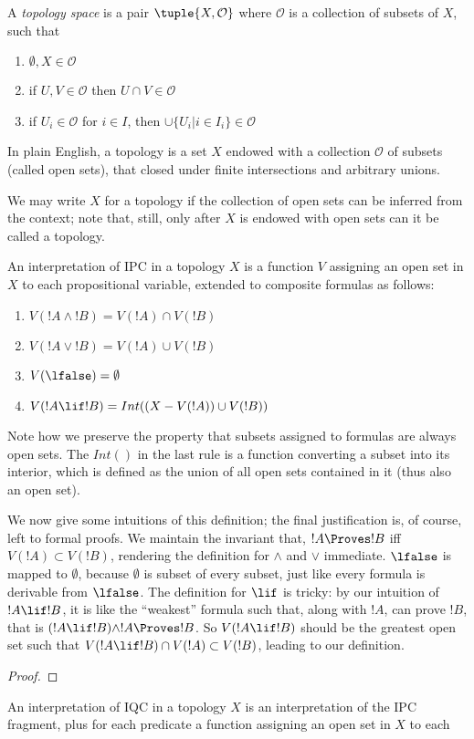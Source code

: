 
\begin{defn}[Topology]
  A \emph{topology space} is a pair $\tuple{X, \mathcal{O}}$ where
  $\mathcal{O}$ is a collection of subsets of $X$, such that
  \begin{enumerate}
  \item $\emptyset, X \in \mathcal{O}$
  \item if $U,V \in \mathcal{O}$ then $U \cap V \in \mathcal{O}$
  \item if $U_i \in \mathcal{O}$ for $i \in I$, then $\cup\{U_i | i \in 
    I_i\} \in \mathcal{O}$
  \end{enumerate}
\end{defn}

In plain English, a topology is a set $X$ endowed with a collection
$\mathcal{O}$ of subsets (called open sets), that closed under finite
intersections and arbitrary unions.

We may write $X$ for a topology if the collection of open sets can be
inferred from the context; note that, still, only after $X$ is endowed
with open sets can it be called a topology.

\begin{defn}
  An interpretation of IPC in a topology $X$ is a function $V$ assigning
  an open set in $X$ to each propositional variable, extended to composite
  formulas as follows:
  \begin{enumerate}
  \item $V(!A \land !B) = V(!A) \cap V(!B)$
  \item $V(!A \lor !B) = V(!A) \cup V(!B)$
  \item $V(\lfalse) = \emptyset$
  \item $V(!A \lif !B) = Int((X - V(!A)) \cup V(!B))$
  \end{enumerate}
\end{defn}

Note how we preserve the property that subsets assigned to formulas are
always open sets. The $Int()$ in the last rule is a function converting a
subset into its interior, which is defined as the union of all open
sets contained in it (thus also an open set).

We now give some intuitions of this definition; the final
justification is, of course, left to formal proofs. We maintain the
invariant that, $!A \Proves !B$ iff $V(!A) \subset V(!B)$, rendering
the definition for $\land$ and $\lor$ immediate. $\lfalse$ is mapped
to $\emptyset$, because $\emptyset$ is subset of every subset, just
like every formula is derivable from $\lfalse$. The definition for
$\lif$ is tricky: by our intuition of $!A \lif !B$, it is like the ``weakest''
formula such that, along with $!A$, can prove $!B$, that is $(!A
\lif !B) \land !A \Proves !B $. So $V(!A \lif !B)$ should be the
greatest open set such that $V(!A \lif !B) \cap V(!A)
\subset V(!B)$, leading to our definition.

\begin{defn}
  
\end{defn}

\begin{proof}
\end{proof}

\begin{defn}
  An interpretation of IQC in a topology $X$ is an interpretation of
  the IPC fragment, plus for each predicate a function assigning an
  open set in $X$ to each 
\end{defn}

